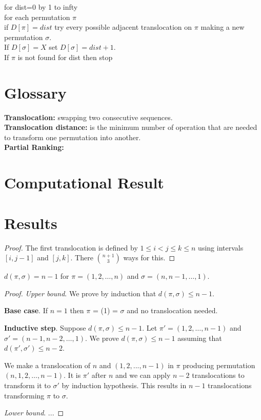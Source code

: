 \documentclass[runningheads]{llncs}
\begin{document}
for dist=0 by 1 to infty\\
for each permutation $\pi$\\
if $D[\pi]=dist$ try every possible adjacent translocation on $\pi$ making a new permutation $\sigma$.\\
If $D[\sigma]=X$ set $D[\sigma]=dist+1$.\\
If $\pi$ is not found for dist then stop

\section*{Glossary}
\textbf{Translocation:} swapping two consecutive sequences. \\
\textbf{Translocation distance:} is the minimum number of operation that are needed to transform one permutation into another. \\
\textbf{Partial Ranking:} 

\vspace{0.5cm}

\section{Computational Result}

\section{Results}

\begin{proof}
The first translocation is defined by $1\le i<j\le k\le n$ using intervals $[i,j-1]$ and $[j,k]$. 
There $\binom{n+1}{3}$ ways for this.
\end{proof}

\begin{theorem}
$d(\pi,\sigma)=n-1$ for $\pi=(1,2,\dots,n)$ and $\sigma=(n,n-1,\dots,1)$.
\end{theorem}

\begin{proof}
{\em Upper bound}. 
We prove by induction that $d(\pi,\sigma)\le n-1$. 

\textbf{Base case}. If $n=1$ then $\pi$ = (1) = $\sigma$ and no translocation needed.

\textbf{Inductive step}.
Suppose $d(\pi,\sigma)\le n-1$.
Let $\pi'=(1,2,\dots,n-1)$ and $\sigma'=(n-1,n-2,\dots,1)$.
We prove $d(\pi,\sigma)\le n-1$ assuming that $d(\pi',\sigma')\le n-2$.

We make a translocation of $n$ and $(1,2,...,n-1)$ in $\pi$ producing permutation $(n, 1, 2, \dots, n-1)$.
It is $\pi'$ after $n$ and we can apply $n-2$ translocations to transform it to $\sigma'$ by induction hypothesis. 
This results in $n-1$ translocations transforming $\pi$ to $\sigma$.

{\em Lower bound}. ...
\end{proof}
\end{document}
